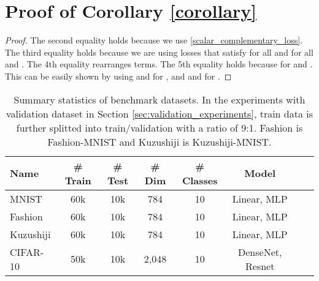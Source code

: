 \documentclass{article}
\begin{document}
\section{Proof of Corollary \ref{corollary}}\label{sec:corollary2proof}
\begin{proof}

The second equality holds because we use \eqref{scalar_complementary_loss}.  The third equality holds because we are using losses that satisfy  for all  and  for all  and .  The 4th equality rearranges terms.  The 5th equality holds because  for  and .  This can be easily shown by using  and  for , and  and  for .
\end{proof}

\begin{table}[]
  \center
  \small
  \caption{Summary statistics of benchmark datasets.  In the experiments with validation dataset in Section \ref{sec:validation_experiments}, train data is further splitted into train/validation with a ratio of 9:1. Fashion is Fashion-MNIST and Kuzushiji is Kuzushiji-MNIST.}
  \tabcolsep=0.07cm
    \begin{tabular}{l|cc|cccc|c}\toprule
    Name & \# Train & \# Test & \# Dim & \# Classes & Model\\\midrule
    MNIST &60k&10k&784& 10 & Linear, MLP\\\midrule
    Fashion &60k&10k&784& 10 & Linear, MLP\\\midrule
    Kuzushiji &60k&10k&784& 10 & Linear, MLP\\\midrule
    CIFAR-10 &50k&10k&2,048& 10 & DenseNet, Resnet\\\bottomrule
  \end{tabular}
  \label{tb:summary_datasets}
\end{table}
\end{document}

